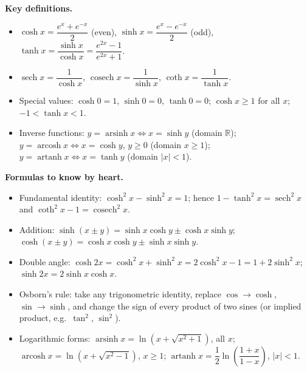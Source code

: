 \documentclass[11pt]{article}
\newcommand{\cle}[1]{{\popxbold\color{popdark}#1}}
\begin{document}
\begin{bilan}
\textbf{Key definitions.}
\begin{itemize}
\item $\cosh x=\dfrac{e^{x}+e^{-x}}{2}$ (even), \quad $\sinh x=\dfrac{e^{x}-e^{-x}}{2}$ (odd), \quad $\tanh x=\dfrac{\sinh x}{\cosh x}=\dfrac{e^{2x}-1}{e^{2x}+1}$.
\item $\operatorname{sech} x=\dfrac{1}{\cosh x}$, \quad $\operatorname{cosech} x=\dfrac{1}{\sinh x}$, \quad $\coth x=\dfrac{1}{\tanh x}$.
\item Special values: $\cosh 0=1$, $\sinh 0=0$, $\tanh 0=0$; $\cosh x\ge 1$ for all $x$; $-1<\tanh x<1$.
\item Inverse functions: $y=\operatorname{arsinh} x \iff x=\sinh y$ (domain $\mathbb{R}$); $y=\operatorname{arcosh} x \iff x=\cosh y$, $y\ge 0$ (domain $x\ge 1$); $y=\operatorname{artanh} x \iff x=\tanh y$ (domain $|x|<1$).
\end{itemize}

\textbf{Formulas to know by heart.}
\begin{itemize}
\item Fundamental identity: $\cosh^{2}x-\sinh^{2}x=1$; hence $1-\tanh^{2}x=\operatorname{sech}^{2}x$ and $\coth^{2}x-1=\operatorname{cosech}^{2}x$.
\item Addition: $\sinh(x\pm y)=\sinh x\cosh y\pm\cosh x\sinh y$; $\cosh(x\pm y)=\cosh x\cosh y\pm\sinh x\sinh y$.
\item Double angle: $\cosh 2x=\cosh^{2}x+\sinh^{2}x=2\cosh^{2}x-1=1+2\sinh^{2}x$; $\sinh 2x=2\sinh x\cosh x$.
\item \cle{Osborn's rule}: take any trigonometric identity, replace $\cos\to\cosh$, $\sin\to\sinh$, and change the sign of every product of two sines (or implied product, e.g.\ $\tan^{2}$, $\sin^{2}$).
\item Logarithmic forms:
$\operatorname{arsinh} x=\ln\!\left(x+\sqrt{x^{2}+1}\right)$, all $x$;
$\operatorname{arcosh} x=\ln\!\left(x+\sqrt{x^{2}-1}\right)$, $x\ge 1$;
$\operatorname{artanh} x=\dfrac{1}{2}\ln\!\left(\dfrac{1+x}{1-x}\right)$, $|x|<1$.
\end{itemize}


\end{bilan}
\end{document}
